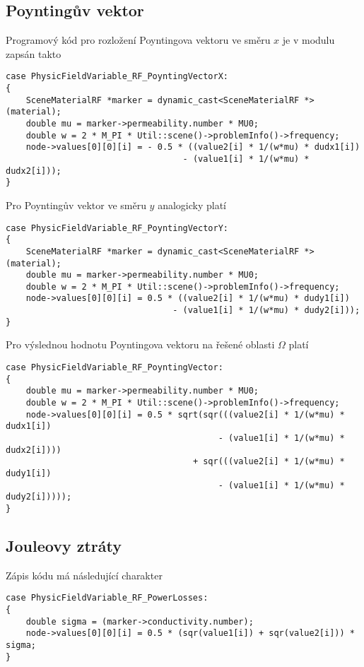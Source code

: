 \subsection*{Poyntingův vektor}
Programový kód pro rozložení Poyntingova vektoru ve směru $x$ je v modulu zapsán takto
\begin{verbatim}
case PhysicFieldVariable_RF_PoyntingVectorX:
{
    SceneMaterialRF *marker = dynamic_cast<SceneMaterialRF *>(material);
    double mu = marker->permeability.number * MU0;
    double w = 2 * M_PI * Util::scene()->problemInfo()->frequency;
    node->values[0][0][i] = - 0.5 * ((value2[i] * 1/(w*mu) * dudx1[i]) 
                                   - (value1[i] * 1/(w*mu) * dudx2[i]));
}
\end{verbatim}
Pro Poyntingův vektor ve směru $y$ analogicky platí
\begin{verbatim}
case PhysicFieldVariable_RF_PoyntingVectorY:
{
    SceneMaterialRF *marker = dynamic_cast<SceneMaterialRF *>(material);
    double mu = marker->permeability.number * MU0;
    double w = 2 * M_PI * Util::scene()->problemInfo()->frequency;
    node->values[0][0][i] = 0.5 * ((value2[i] * 1/(w*mu) * dudy1[i]) 
                                 - (value1[i] * 1/(w*mu) * dudy2[i]));
}
\end{verbatim}
Pro výslednou hodnotu Poyntingova vektoru na řešené oblasti $\Omega$ platí
\begin{verbatim}
case PhysicFieldVariable_RF_PoyntingVector:
{
    double mu = marker->permeability.number * MU0;
    double w = 2 * M_PI * Util::scene()->problemInfo()->frequency;
    node->values[0][0][i] = 0.5 * sqrt(sqr(((value2[i] * 1/(w*mu) * dudx1[i]) 
                                          - (value1[i] * 1/(w*mu) * dudx2[i]))) 
                                     + sqr(((value2[i] * 1/(w*mu) * dudy1[i]) 
                                          - (value1[i] * 1/(w*mu) * dudy2[i]))));
}
\end{verbatim}

\subsection*{Jouleovy ztráty}
Zápis kódu má následující charakter
\begin{verbatim}
case PhysicFieldVariable_RF_PowerLosses:
{
    double sigma = (marker->conductivity.number);
    node->values[0][0][i] = 0.5 * (sqr(value1[i]) + sqr(value2[i])) * sigma;
}
\end{verbatim}
